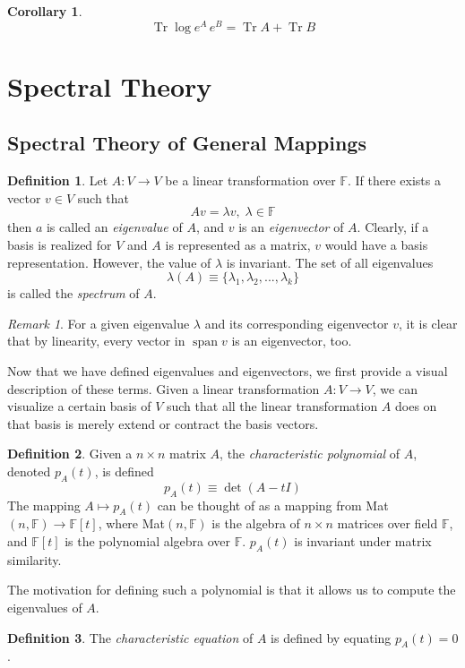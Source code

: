 \documentclass{article}
\DeclareMathOperator{\Tr}{Tr}
\DeclareMathOperator{\Span}{span}
\newtheorem{corollary}{Corollary}[theorem]
\theoremstyle{remark}
\newtheorem*{remark}{Remark}
\theoremstyle{definition}
\newtheorem{definition}{Definition}[section]
\begin{document}
\begin{corollary}
\[\Tr{\log{e^A \, e^B}} = \Tr{A} + \Tr{B}\]
\end{corollary}

\section{Spectral Theory} 
\subsection{Spectral Theory of General Mappings}
\begin{definition}
Let $A: V \longrightarrow V$ be a linear transformation over $\mathbb{F}$. If there exists a vector $v \in V$ such that
\[ A v = \lambda v, \; \lambda \in \mathbb{F}\]
then $a$ is called an \textit{eigenvalue} of $A$, and $v$ is an \textit{eigenvector} of $A$. Clearly, if a basis is realized for $V$ and $A$ is represented as a matrix, $v$ would have a basis representation. However, the value of $\lambda$ is invariant. The set of all eigenvalues 
\[\lambda(A) \equiv \{ \lambda_1, \lambda_2, ..., \lambda_k\}\]
is called the \textit{spectrum} of $A$. 
\end{definition}

\begin{remark}
For a given eigenvalue $\lambda$ and its corresponding eigenvector $v$, it is clear that by linearity, every vector in $\Span v$ is an eigenvector, too. 
\end{remark}

Now that we have defined eigenvalues and eigenvectors, we first provide a visual description of these terms. Given a linear transformation $A: V \longrightarrow V$, we can visualize a certain basis of $V$ such that all the linear transformation $A$ does on that basis is merely extend or contract the basis vectors.

\begin{definition}
Given a $n \times n$ matrix $A$, the \textit{characteristic polynomial} of $A$, denoted $p_A (t)$, is defined
\[ p_A (t) \equiv \det{(A - t I)}\]
The mapping $A \mapsto p_A (t)$ can be thought of as a mapping from Mat$(n, \mathbb{F}) \longrightarrow \mathbb{F}[t]$, where Mat$(n, \mathbb{F})$ is the algebra of $n \times n$ matrices over field $\mathbb{F}$, and $\mathbb{F}[t]$ is the polynomial algebra over $\mathbb{F}$. $p_A (t)$ is invariant under matrix similarity. 
\end{definition}

The motivation for defining such a polynomial is that it allows us to compute the eigenvalues of $A$. 
\begin{definition}
The \textit{characteristic equation} of $A$ is defined by equating $p_A (t) = 0$. 
\end{definition}
\end{document}
